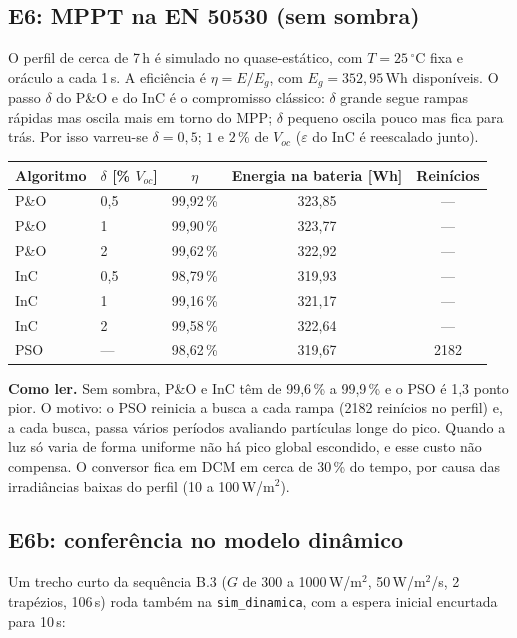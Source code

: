 \subsection{E6: MPPT na EN 50530 (sem sombra)}\label{sec:e6}

O perfil de cerca de 7\,h \'e simulado no quase-est\'atico, com $T=25\,^\circ$C fixa e or\'aculo a cada 1\,s. A efici\^encia \'e $\eta=E/E_g$, com $E_g=352{,}95$\,Wh dispon\'iveis. O passo $\delta$ do P\&O e
do InC \'e o compromisso cl\'assico: $\delta$ grande segue rampas r\'apidas mas oscila mais em torno do MPP; $\delta$ pequeno oscila pouco mas fica para tr\'as. Por isso varreu-se $\delta=0{,}5$; $1$ e
$2$\,\% de $V_{oc}$ ($\varepsilon$ do InC \'e reescalado junto).

\begin{resultado}
\small\centering
\begin{tabular}{@{}llccc@{}}
\toprule
Algoritmo & $\delta$ [\% $V_{oc}$] & $\eta$ & Energia na bateria [Wh] & Rein\'icios \\ \midrule
P\&O & 0,5 & 99,92\,\% & 323,85 & --- \\
P\&O & 1 & 99,90\,\% & 323,77 & --- \\
P\&O & 2 & 99,62\,\% & 322,92 & --- \\
InC & 0,5 & 98,79\,\% & 319,93 & --- \\
InC & 1 & 99,16\,\% & 321,17 & --- \\
InC & 2 & 99,58\,\% & 322,64 & --- \\
PSO & --- & 98,62\,\% & 319,67 & 2182 \\
\bottomrule
\end{tabular}
\end{resultado}

\textbf{Como ler.} Sem sombra, P\&O e InC t\^em de 99,6\,\% a 99,9\,\% e o PSO \'e 1,3 ponto pior. O motivo: o PSO reinicia a busca a cada rampa (2182 rein\'icios no perfil) e, a cada busca, passa v\'arios per\'iodos avaliando
part\'iculas longe do pico. Quando a luz s\'o varia de forma uniforme n\~ao h\'a pico global escondido, e esse custo n\~ao compensa. O conversor fica em DCM em cerca de 30\,\% do tempo, por causa das irradi\^ancias baixas do perfil (10 a 100\,W/m$^2$).

\subsection{E6b: confer\^encia no modelo din\^amico}\label{sec:e6b}

Um trecho curto da sequ\^encia B.3 ($G$ de 300 a 1000\,W/m$^2$, 50\,W/m$^2$/s, 2 trap\'ezios, 106\,s) roda tamb\'em na \texttt{sim\_dinamica}, com a espera inicial encurtada para 10\,s:

